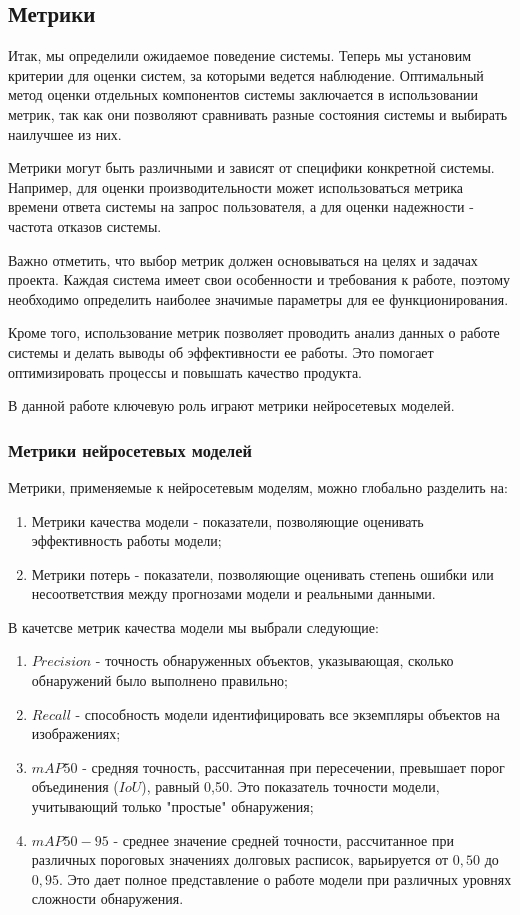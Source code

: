 \subsection{Метрики}
Итак, мы определили ожидаемое поведение системы. Теперь мы установим критерии для оценки систем, за которыми ведется наблюдение. Оптимальный метод оценки отдельных компонентов системы заключается в использовании метрик, так как они позволяют сравнивать разные состояния системы и выбирать наилучшее из них.

Метрики могут быть различными и зависят от специфики конкретной системы. Например, для оценки производительности может использоваться метрика времени ответа системы на запрос пользователя, а для оценки надежности - частота отказов системы.

Важно отметить, что выбор метрик должен основываться на целях и задачах проекта. Каждая система имеет свои особенности и требования к работе, поэтому необходимо определить наиболее значимые параметры для ее функционирования.

Кроме того, использование метрик позволяет проводить анализ данных о работе системы и делать выводы об эффективности ее работы. Это помогает оптимизировать процессы и повышать качество продукта.

В данной работе ключевую роль играют метрики нейросетевых моделей.

\subsubsection{Метрики нейросетевых моделей}

Метрики, применяемые к нейросетевым моделям, можно глобально разделить на:
\begin{enumerate}
    \item Метрики качества модели - показатели, позволяющие оценивать эффективность работы модели;
    \item Метрики потерь - показатели, позволяющие оценивать степень ошибки или несоответствия между прогнозами модели и реальными данными.
\end{enumerate}

В качетсве метрик качества модели мы выбрали следующие:

\begin{enumerate}
    \item $Precision$ - точность обнаруженных объектов, указывающая, сколько обнаружений было выполнено правильно;
    \item $Recall$ - способность модели идентифицировать все экземпляры объектов на изображениях;
    \item $mAP50$ - средняя точность, рассчитанная при пересечении, превышает порог объединения ($IoU$), равный 0,50. Это показатель точности модели, учитывающий только "простые" обнаружения;
    \item $mAP50-95$ - среднее значение средней точности, рассчитанное при различных пороговых значениях долговых расписок, варьируется от $0,50$ до $0,95$. Это дает полное представление о работе модели при различных уровнях сложности обнаружения.
\end{enumerate}

